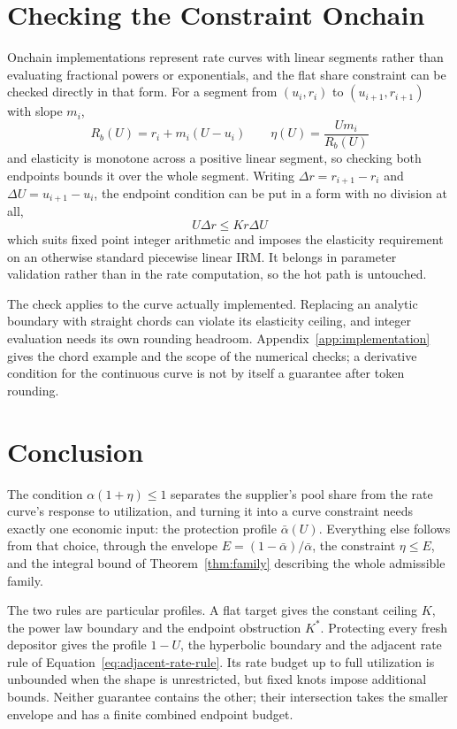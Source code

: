 \documentclass[11pt,a4paper]{article}
\begin{document}
\section{Checking the Constraint Onchain}
\label{sec:onchain}

Onchain implementations represent rate curves with linear segments rather than evaluating fractional powers or exponentials, and the flat share constraint can be checked directly in that form. For a segment from $(u_i,r_i)$ to $(u_{i+1},r_{i+1})$ with slope $m_i$,
\[
R_b(U)=r_i+m_i(U-u_i)
\qquad
\eta(U)=\frac{Um_i}{R_b(U)}
\]
and elasticity is monotone across a positive linear segment, so checking both endpoints bounds it over the whole segment. Writing $\Delta r=r_{i+1}-r_i$ and $\Delta U=u_{i+1}-u_i$, the endpoint condition can be put in a form with no division at all,
\[
\boxed{
U\Delta r\leq Kr\Delta U
}
\]
which suits fixed point integer arithmetic and imposes the elasticity requirement on an otherwise standard piecewise linear IRM. It belongs in parameter validation rather than in the rate computation, so the hot path is untouched.

The check applies to the curve actually implemented. Replacing an analytic boundary with straight chords can violate its elasticity ceiling, and integer evaluation needs its own rounding headroom. Appendix~\ref{app:implementation} gives the chord example and the scope of the numerical checks; a derivative condition for the continuous curve is not by itself a guarantee after token rounding.

\section{Conclusion}

The condition $\alpha(1+\eta)\leq1$ separates the supplier's pool share from the rate curve's response to utilization, and turning it into a curve constraint needs exactly one economic input: the protection profile $\bar\alpha(U)$. Everything else follows from that choice, through the envelope $E=(1-\bar\alpha)/\bar\alpha$, the constraint $\eta\leq E$, and the integral bound of Theorem~\ref{thm:family} describing the whole admissible family.

The two rules are particular profiles. A flat target gives the constant ceiling $K$, the power law boundary and the endpoint obstruction $K^*$. Protecting every fresh depositor gives the profile $1-U$, the hyperbolic boundary and the adjacent rate rule of Equation~\ref{eq:adjacent-rate-rule}. Its rate budget up to full utilization is unbounded when the shape is unrestricted, but fixed knots impose additional bounds. Neither guarantee contains the other; their intersection takes the smaller envelope and has a finite combined endpoint budget.
\end{document}
